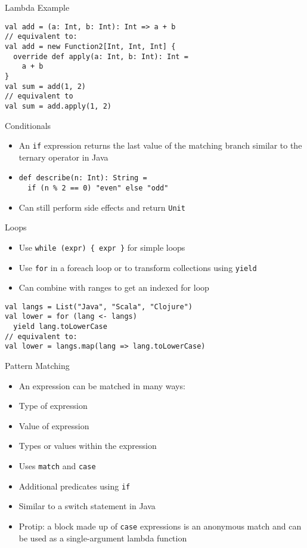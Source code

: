 \documentclass{beamer}
\begin{document}
\begin{frame}[fragile]{Lambda Example}
\begin{lstlisting}
val add = (a: Int, b: Int): Int => a + b
// equivalent to:
val add = new Function2[Int, Int, Int] {
  override def apply(a: Int, b: Int): Int =
    a + b
}
val sum = add(1, 2)
// equivalent to
val sum = add.apply(1, 2)
\end{lstlisting}
\end{frame}

\begin{frame}[fragile]{Conditionals}
\begin{itemize}
\item An \lstinline{if} expression returns the last value of the matching branch similar
to the ternary operator in Java
\item
\begin{lstlisting}
def describe(n: Int): String =
  if (n % 2 == 0) "even" else "odd"
\end{lstlisting}
\item Can still perform side effects and return \lstinline{Unit}
\end{itemize}
\end{frame}

\begin{frame}[fragile]{Loops}
\begin{itemize}
\item Use \lstinline$while (expr) { expr }$ for simple loops
\item Use \lstinline{for} in a foreach loop or to transform collections using \lstinline{yield}
\item Can combine with ranges to get an indexed for loop
\end{itemize}
\begin{lstlisting}
val langs = List("Java", "Scala", "Clojure")
val lower = for (lang <- langs)
  yield lang.toLowerCase
// equivalent to:
val lower = langs.map(lang => lang.toLowerCase)
\end{lstlisting}
\end{frame}

\begin{frame}{Pattern Matching}
\begin{itemize}
\item An expression can be matched in many ways:
\item Type of expression
\item Value of expression
\item Types or values within the expression
\item Uses \lstinline{match} and \lstinline{case}
\item Additional predicates using \lstinline{if}
\item Similar to a switch statement in Java
\item Protip: a block made up of \lstinline{case} expressions is an anonymous match and can be
used as a single-argument lambda function
\end{itemize}
\end{frame}
\end{document}
